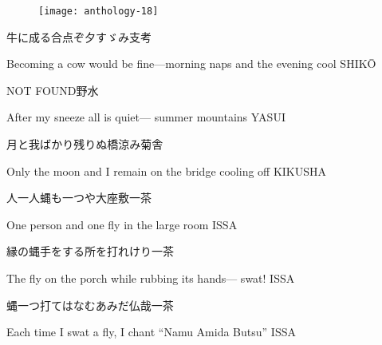 \begin{figure}
    \texttt{[image: anthology-18]}
\end{figure}

\begin{haiku}
    {\FH 牛に成る合点ぞ夕すゞみ}\hfill{\FH 支考}

    \vin{} Becoming a cow
    \vin{} \vin{} would be fine---morning naps
    \vin{} \vin{} \vin{} and the evening cool \hspace{\fill} SHIK\={O}
\end{haiku}

\begin{haiku}
    {NOT FOUND}\hfill{\FH 野水}

    \vin{} After my sneeze
    \vin{} \vin{} all is quiet---
    \vin{} \vin{} \vin{} summer mountains \hspace{\fill} YASUI
\end{haiku}

\begin{haiku}
    {\FH 月と我ばかり残りぬ橋涼み}\hfill{\FH 菊舎}

    \vin{} Only the moon and I
    \vin{} \vin{} remain on the bridge
    \vin{} \vin{} \vin{} cooling off \hspace{\fill} KIKUSHA
\end{haiku}

\begin{haiku}
    {\FH 人一人蝿も一つや大座敷}\hfill{\FH 一茶}

    \vin{} One person
    \vin{} \vin{} and one fly
    \vin{} \vin{} \vin{} in the large room \hspace{\fill} ISSA
\end{haiku}

\begin{haiku}
    {\FH 縁の蝿手をする所を打れけり}\hfill{\FH 一茶}

    \vin{} The fly on the porch
    \vin{} \vin{} while rubbing its hands---
    \vin{} \vin{} \vin{} swat! \hspace{\fill} ISSA
\end{haiku}

\begin{haiku}
    {\FH 蝿一つ打てはなむあみだ仏哉}\hfill{\FH 一茶}

    \vin{} Each time
    \vin{} \vin{} I swat a fly, I chant
    \vin{} \vin{} \vin{} ``Namu Amida Butsu'' \hspace{\fill} ISSA
\end{haiku}

